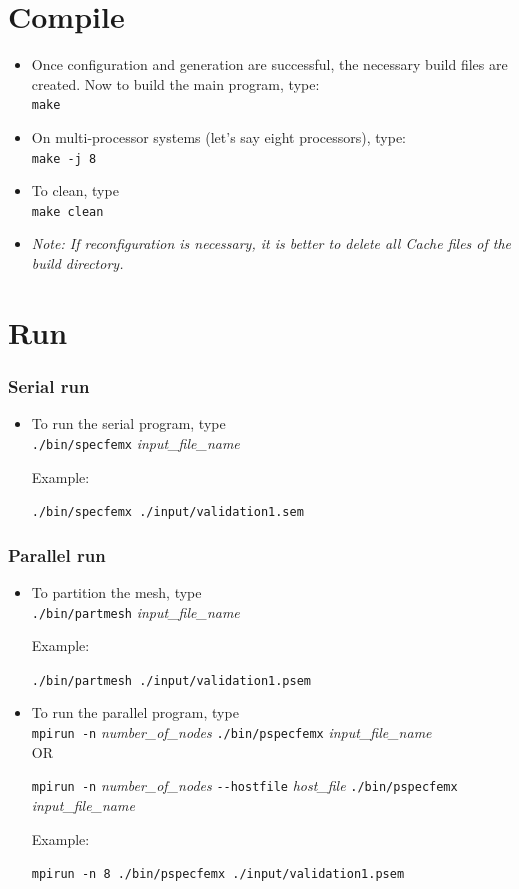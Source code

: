 \section{Compile}
\begin{itemize}[]
  \item Once configuration and generation are successful, the necessary build files are created. Now to build the main program, type: \\
  \texttt{make}

  \item On multi-processor systems (let's say eight processors), type:\\
  \texttt{make -j 8}

  \item To clean, type\\
  \texttt{make clean}
  \item{\emph{Note: If reconfiguration is necessary, it is better to delete all Cache files of the build directory.}}
\end{itemize}

\section{Run}
\subsubsection{Serial run}
\begin{itemize}[-]
\item To run the serial program, type \\
    \texttt{./bin/specfemx} \emph{input\_file\_name}

    Example:

    \texttt{./bin/specfemx ./input/validation1.sem}

\end{itemize}

\subsubsection{Parallel run}
\begin{itemize}[-]
\item To partition the mesh, type \\
    \texttt{./bin/partmesh} \emph{input\_file\_name}

    Example:

    \texttt{./bin/partmesh ./input/validation1.psem}

\item To run the parallel program, type \\
    \texttt{mpirun -n} \emph{number\_of\_nodes} \texttt{./bin/pspecfemx} \emph{input\_file\_name} \\

    OR

    \texttt{mpirun -n} \emph{number\_of\_nodes} \texttt{-{}-hostfile} \emph{host\_file} \texttt{./bin/pspecfemx} \emph{input\_file\_name}

    Example:

    \texttt{mpirun -n 8 ./bin/pspecfemx ./input/validation1.psem}
\end{itemize}

